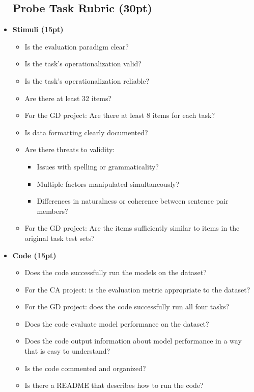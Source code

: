 \documentclass[12pt,table]{article}
\begin{document}
\begin{itemize}
\subsection*{Probe Task Rubric (30pt)}

\item \textbf{Stimuli (15pt)}
\begin{itemize}
\item Is the evaluation paradigm clear?
\item Is the task's operationalization valid?
\item Is the task's operationalization reliable?
\item Are there at least 32 items?
\item For the GD project: Are there at least 8 items for each task?
\item Is data formatting clearly documented?
\item Are there threats to validity:\begin{itemize}
\item Issues with spelling or grammaticality?
\item Multiple factors manipulated simultaneously?
\item Differences in naturalness or coherence between sentence pair members?
\end{itemize}
\item For the GD project: Are the items sufficiently similar to items in the original task test sets?
\end{itemize}
\item \textbf{Code (15pt)}
\begin{itemize}
\item Does the code successfully run the models on the dataset?
\item For the CA project: is the evaluation metric appropriate to the dataset?
\item For the GD project: does the code successfully run all four tasks?
\item Does the code evaluate model performance on the dataset?
\item Does the code output information about model performance in a way that is easy to understand?
\item Is the code commented and organized?
\item Is there a README that describes how to run the code?
\end{itemize}
\end{itemize}
\end{document}
